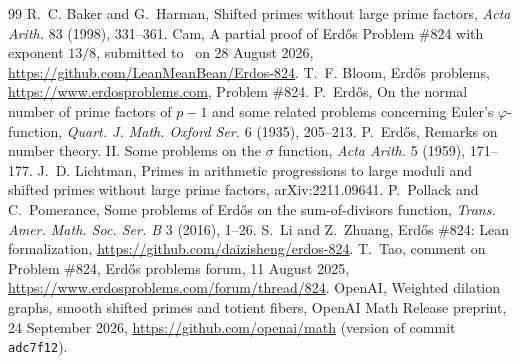 \documentclass[11pt]{amsart}
\theoremstyle{definition}
\theoremstyle{remark}
\newcommand{\repo}{\url{https://github.com/daizisheng/erdos-824}}
\begin{document}
\begin{thebibliography}{99}
 R.~C. Baker and G.~Harman, Shifted primes without large prime factors, \emph{Acta Arith.} 83 (1998), 331--361.
 Cam, A partial proof of Erd\H{o}s Problem \#824 with exponent $13/8$, submitted to~\cite{EP} on 28 August 2026, \url{https://github.com/LeanMeanBean/Erdos-824}.
 T.~F. Bloom, Erd\H{o}s problems, \url{https://www.erdosproblems.com}, Problem \#824.
 P.~Erd\H{o}s, On the normal number of prime factors of $p-1$ and some related problems concerning Euler's $\varphi$-function, \emph{Quart. J. Math. Oxford Ser.} 6 (1935), 205--213.
 P.~Erd\H{o}s, Remarks on number theory. II. Some problems on the $\sigma$ function, \emph{Acta Arith.} 5 (1959), 171--177.
 J.~D. Lichtman, Primes in arithmetic progressions to large moduli and shifted primes without large prime factors, arXiv:2211.09641.
 P.~Pollack and C.~Pomerance, Some problems of Erd\H{o}s on the sum-of-divisors function, \emph{Trans. Amer. Math. Soc. Ser. B} 3 (2016), 1--26.
 S.~Li and Z.~Zhuang, Erd\H{o}s \#824: Lean formalization, \repo.
 T.~Tao, comment on Problem \#824, Erd\H{o}s problems forum, 11 August 2025, \url{https://www.erdosproblems.com/forum/thread/824}.
 OpenAI, Weighted dilation graphs, smooth shifted primes and totient fibers, OpenAI Math Release preprint, 24 September 2026, \url{https://github.com/openai/math} (version of commit \texttt{adc7f12}).
\end{thebibliography}
\end{document}
